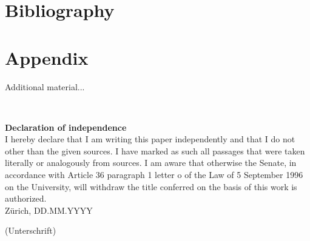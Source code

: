 \documentclass[12pt,a4paper]{article}
\begin{document}
\blindtext

\newpage

\section{Bibliography}

\printbibliography

\begin{description}
\item
\end{description}

\vspace{0.8cm}

\newpage
\appendix
\section{Appendix }

Additional material...

\newpage

\thispagestyle{empty}

\ \vspace{1cm}

{\bf \huge Declaration of independence} \\[0.4cm]

I hereby declare that I am writing this paper independently and that I do not
other than the given sources. I have marked as such all passages that were taken literally or analogously from sources. I am aware that otherwise the Senate, in accordance with Article 36 paragraph 1 letter o of the Law of 5 September 1996 on the University, will withdraw the title conferred on the basis of this work
is authorized.\\[0.5cm]

Zürich, DD.MM.YYYY \hspace{5cm} \hrulefill \hspace{1cm} \\[0cm]
\begin{minipage}[h]{15cm} \hspace{10.5cm}  {\small (Unterschrift)}
\end{minipage}
\end{document}
